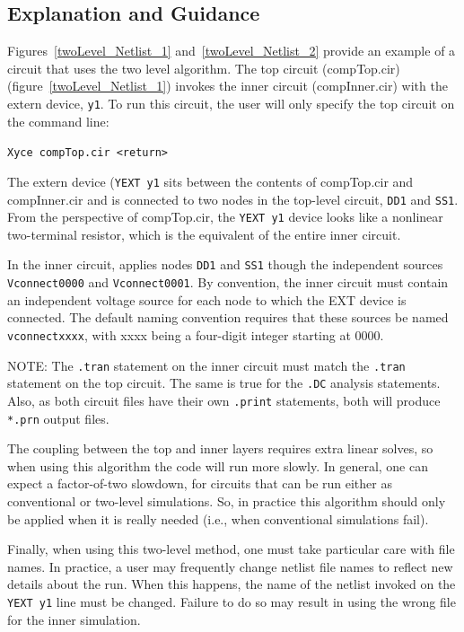 \subsection{Explanation and Guidance}

Figures~\ref{twoLevel_Netlist_1} and~\ref{twoLevel_Netlist_2} provide an example of a circuit that uses the two level algorithm. The top
circuit (compTop.cir) (figure~\ref{twoLevel_Netlist_1}) invokes the inner circuit (compInner.cir) with the extern device, {\tt y1}.  
To run this circuit, the user will only specify the top circuit on the command line:

\texttt{Xyce compTop.cir <return>}

The extern device (\texttt{YEXT y1} sits between the contents of compTop.cir and compInner.cir and is connected to two nodes in the top-level circuit, \texttt{DD1} and \texttt{SS1}.   From the perspective of compTop.cir, the \texttt{YEXT y1} device looks like a nonlinear two-terminal resistor, which is the equivalent of the entire inner circuit.

In the inner circuit, \Xyce{} applies nodes \texttt{DD1} and \texttt{SS1} though the independent  sources \texttt{Vconnect0000} and \texttt{Vconnect0001}.
By convention, the inner circuit must contain an independent voltage
source for each node to which the EXT device is connected.  The default naming
convention requires that these sources be named {\tt vconnectxxxx}, with xxxx 
being a four-digit integer starting at 0000.

NOTE:	The \texttt{.tran} statement on the inner circuit must match the
\texttt{.tran} statement on the top circuit.  The same is true for the 
\texttt{.DC} analysis statements. Also, as both circuit files have their own \texttt{.print} statements, both will produce \texttt{*.prn} output files.

The coupling between the top and inner layers requires extra linear solves, so when using this algorithm the code will run more slowly. In general, one can expect a factor-of-two slowdown, for circuits that can be run either as conventional or two-level simulations. So, in practice this algorithm should only be applied when it is really needed (i.e., when conventional simulations fail).

Finally, when using this two-level method, one must take particular care with file 
names.  In practice, a \Xyce{} user may frequently change netlist file names to reflect
new details about the run.  When this happens, the name of the netlist invoked 
on the \texttt{YEXT y1} line must be changed.  Failure to do so may result in
using the wrong file for the inner simulation.

